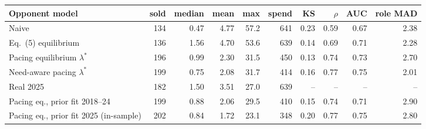 \begin{tabular}{@{}lrrrrrrrrr@{}}\toprule
Opponent model & sold & median & mean & max & spend & KS & $\rho$ & AUC & role MAD\\\midrule
Naive & 134 & 0.47 & 4.77 & 57.2 & 641 & 0.23 & 0.59 & 0.67 & 2.38\\
Eq.~(5) equilibrium & 136 & 1.56 & 4.70 & 53.6 & 639 & 0.14 & 0.69 & 0.71 & 2.28\\
Pacing equilibrium $\lambda^*$ & 196 & 0.99 & 2.30 & 31.5 & 450 & 0.13 & 0.74 & 0.73 & 2.70\\
Need-aware pacing $\lambda^*$ & 199 & 0.75 & 2.08 & 31.7 & 414 & 0.16 & 0.77 & 0.75 & 2.01\\
\midrule Real 2025 & 182 & 1.50 & 3.51 & 27.0 & 639 & -- & -- & -- & --\\
Pacing eq., prior fit 2018--24 & 199 & 0.88 & 2.06 & 29.5 & 410 & 0.15 & 0.74 & 0.71 & 2.90\\
Pacing eq., prior fit 2025 (in-sample) & 202 & 0.84 & 1.72 & 23.1 & 348 & 0.20 & 0.77 & 0.75 & 2.80\\
\bottomrule\end{tabular}
